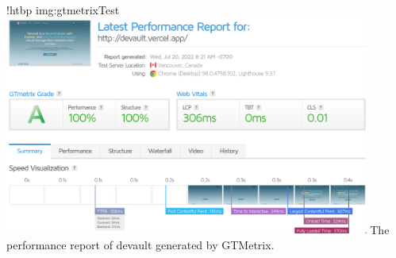 \namedfigure
{!htbp}
{img:gtmetrixTest}
{\includegraphics[width=0.9\textwidth]{resources/images/gtmetrix-test.png}}
{The performance report of devault generated by GTMetrix.}
